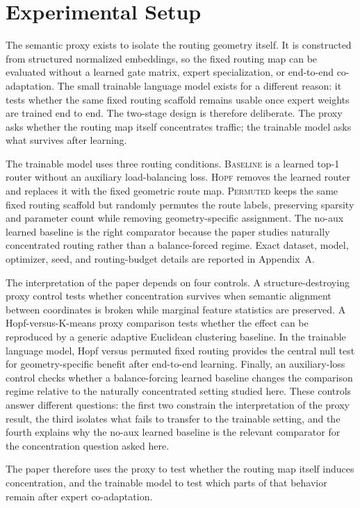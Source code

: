 \documentclass[10pt,twocolumn,letterpaper]{article}
\begin{document}
\section{Experimental Setup}
The semantic proxy exists to isolate the routing geometry itself. It is constructed from structured normalized embeddings, so the fixed routing map can be evaluated without a learned gate matrix, expert specialization, or end-to-end co-adaptation. The small trainable language model exists for a different reason: it tests whether the same fixed routing scaffold remains usable once expert weights are trained end to end. The two-stage design is therefore deliberate. The proxy asks whether the routing map itself concentrates traffic; the trainable model asks what survives after learning.

The trainable model uses three routing conditions. \textsc{Baseline} is a learned top-1 router without an auxiliary load-balancing loss. \textsc{Hopf} removes the learned router and replaces it with the fixed geometric route map. \textsc{Permuted} keeps the same fixed routing scaffold but randomly permutes the route labels, preserving sparsity and parameter count while removing geometry-specific assignment. The no-aux learned baseline is the right comparator because the paper studies naturally concentrated routing rather than a balance-forced regime. Exact dataset, model, optimizer, seed, and routing-budget details are reported in Appendix~A.

The interpretation of the paper depends on four controls. A structure-destroying proxy control tests whether concentration survives when semantic alignment between coordinates is broken while marginal feature statistics are preserved. A Hopf-versus-K-means proxy comparison tests whether the effect can be reproduced by a generic adaptive Euclidean clustering baseline. In the trainable language model, Hopf versus permuted fixed routing provides the central null test for geometry-specific benefit after end-to-end learning. Finally, an auxiliary-loss control checks whether a balance-forcing learned baseline changes the comparison regime relative to the naturally concentrated setting studied here. These controls answer different questions: the first two constrain the interpretation of the proxy result, the third isolates what fails to transfer to the trainable setting, and the fourth explains why the no-aux learned baseline is the relevant comparator for the concentration question asked here.

The paper therefore uses the proxy to test whether the routing map itself induces concentration, and the trainable model to test which parts of that behavior remain after expert co-adaptation.
\end{document}
